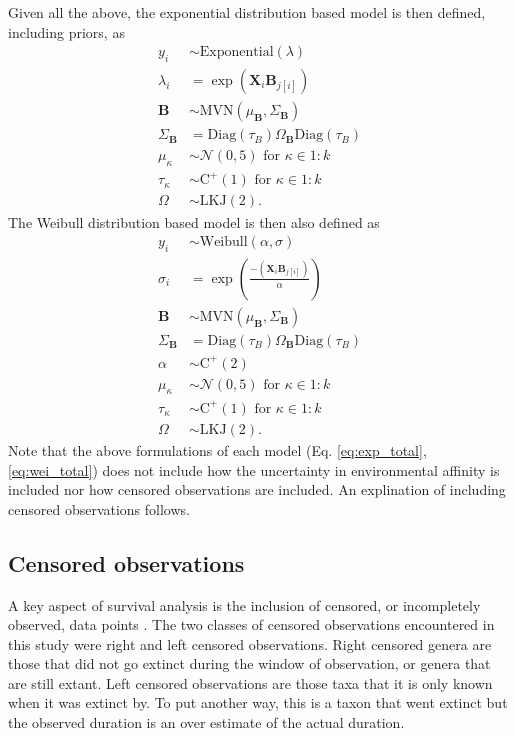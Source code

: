 \documentclass[12pt,letterpaper]{article}
\begin{document}
Given all the above, the exponential distribution based model is then defined, including priors, as 
\begin{equation}
  \begin{aligned}
    y_{i} &\sim \mathrm{Exponential}(\lambda) \\
    \lambda_{i} &= \exp(\mathbf{X}_{i} \mathbf{B}_{j[i]}) \\
    \mathbf{B} &\sim \mathrm{MVN}(\mu_{\mathbf{B}}, \Sigma_{\mathbf{B}}) \\
    \Sigma_{\mathbf{B}} &= \text{Diag}(\tau_{B}) \Omega_{\mathbf{B}} \text{Diag}(\tau_{B}) \\
    \mu_{\kappa} &\sim \mathcal{N}(0, 5) \text{ for } \kappa \in 1:k \\
    \tau_{\kappa} &\sim \mathrm{C^{+}}(1) \text{ for } \kappa \in 1:k \\
    \Omega &\sim \text{LKJ}(2).
  \end{aligned}
  \label{eq:exp_total}
\end{equation}
The Weibull distribution based model is then also defined as
\begin{equation}
  \begin{aligned}
    y_{i} &\sim \mathrm{Weibull}(\alpha, \sigma) \\
    \sigma_{i} &= \exp\left(\frac{-(\mathbf{X}_{i} \mathbf{B}_{j[i]})}{\alpha}\right) \\
    \mathbf{B} &\sim \mathrm{MVN}(\mu_{\mathbf{B}}, \Sigma_{\mathbf{B}}) \\
    \Sigma_{\mathbf{B}} &= \text{Diag}(\tau_{B}) \Omega_{\mathbf{B}} \text{Diag}(\tau_{B}) \\
    \alpha &\sim \mathrm{C^{+}}(2) \\
    \mu_{\kappa} &\sim \mathcal{N}(0, 5) \text{ for } \kappa \in 1:k \\
    \tau_{\kappa} &\sim \mathrm{C^{+}}(1) \text{ for } \kappa \in 1:k \\
    \Omega &\sim \text{LKJ}(2).
  \end{aligned}
  \label{eq:wei_total}
\end{equation}
Note that the above formulations of each model (Eq. \ref{eq:exp_total}, \ref{eq:wei_total}) does not include how the uncertainty in environmental affinity is included nor how censored observations are included. An explination of including censored observations follows.


\subsection{Censored observations}
A key aspect of survival analysis is the inclusion of censored, or incompletely observed, data points \citep{Ibrahim2001,Klein2003}. The two classes of censored observations encountered in this study were right and left censored observations. Right censored genera are those that did not go extinct during the window of observation, or genera that are still extant. Left censored observations are those taxa that it is only known when it was extinct by. To put another way, this is a taxon that went extinct but the observed duration is an over estimate of the actual duration. 
\end{document}
